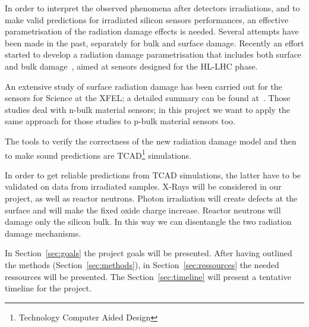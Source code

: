 \documentclass[dvips,12pt]{article}
\begin{document}
In order to interpret the observed phenomena after detectors irradiations,
 and to make valid predictions for irradiated silicon 
sensors performances, an effective parametrisation of the radiation damage effects is needed. 
Several attempts have been made in the past, separately for bulk and surface damage. 
Recently an effort started to develop a radiation damage parametrisation that includes both 
surface and bulk damage~\cite{Passeri2015}, aimed at sensors designed for the HL-LHC 
phase.

An extensive study of surface radiation damage has been carried out for the sensors 
for Science at the XFEL; a detailed summary can be found at~\cite{zhang-thesis}.
Those studies deal with n-bulk material sensors; in this project we want to apply the 
same approach for those studies to p-bulk material sensors too.

The tools to verify the correctness of the new radiation damage model and then to make 
sound predictions are TCAD\footnote{Technology Computer Aided Design} simulations. 

In order to get reliable predictions from TCAD simulations, the latter have to be validated 
on data from irradiated samples. X-Rays will be considered in our project, as 
well as reactor neutrons.
Photon irradiation will create defects at the surface and will make the fixed oxide charge increase. 
Reactor neutrons will damage only the silicon bulk. In this way we can disentangle the two 
radiation damage mechanisms.  

In Section~\ref{sec:goals} the project goals will be presented. After having outlined the methods 
(Section~\ref{sec:methods}), in Section~\ref{sec:ressources} the needed ressources will be 
presented. The Section~\ref{sec:timeline} will present a tentative timeline for the project. 
\end{document}
